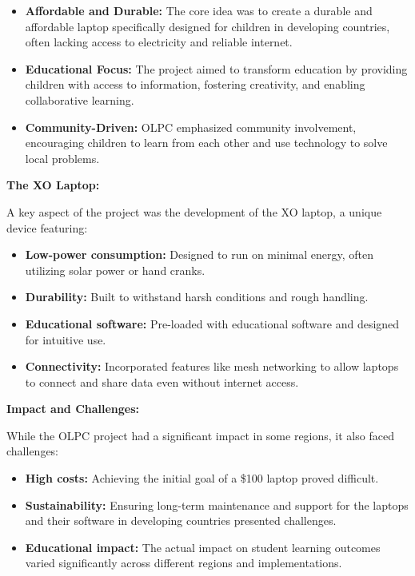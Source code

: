 \documentclass[a4paper,11pt]{article}
\begin{document}
\begin{itemize}
	\item \textbf{Affordable and Durable:}
	 The core idea was to create a durable and affordable laptop specifically designed for children in developing countries, often lacking access to electricity and reliable internet.
	\item \textbf{Educational Focus:}
	 The project aimed to transform education by providing children with access to information, fostering creativity, and enabling collaborative learning.
	\item \textbf{Community-Driven:}
	 OLPC emphasized community involvement, encouraging children to learn from each other and use technology to solve local problems.
\end{itemize}

\textbf{The XO Laptop:}

A key aspect of the project was the development of the XO laptop, a unique device featuring:
\begin{itemize}
	\item \textbf{Low-power consumption:}
	 Designed to run on minimal energy, often utilizing solar power or hand cranks.
	\item \textbf{Durability:}
	 Built to withstand harsh conditions and rough handling.
	\item \textbf{Educational software:}
	 Pre-loaded with educational software and designed for intuitive use.
	\item \textbf{Connectivity:}
	 Incorporated features like mesh networking to allow laptops to connect and share data even without internet access.
\end{itemize}

\textbf{Impact and Challenges:}

While the OLPC project had a significant impact in some regions, it also faced challenges:
\begin{itemize}
	\item \textbf{High costs:}
	 Achieving the initial goal of a \$100 laptop proved difficult.
	\item \textbf{Sustainability:}
	 Ensuring long-term maintenance and support for the laptops and their software in developing countries presented challenges.
	\item \textbf{Educational impact:}
	 The actual impact on student learning outcomes varied significantly across different regions and implementations.
\end{itemize}
\end{document}
